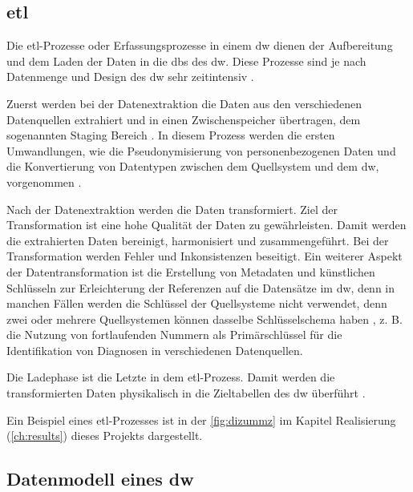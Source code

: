 
\subsection{\acs{etl}} \label{subsec:etl} 

Die \acf{etl}-Prozesse oder Erfassungsprozesse in einem \ac{dw} dienen der Aufbereitung und dem Laden der Daten in die \acp{db} des \ac{dw}. Diese Prozesse sind je nach Datenmenge und Design des \ac{dw} sehr zeitintensiv \cite{dwbauer, dwtool}.

Zuerst werden bei der Datenextraktion die Daten aus den verschiedenen Datenquellen extrahiert und in einen Zwischenspeicher übertragen, dem sogenannten Staging Bereich \cite{dwtool}. In diesem Prozess werden die ersten Umwandlungen, wie die Pseudonymisierung von personenbezogenen Daten und die Konvertierung von Datentypen zwischen dem Quellsystem und dem \ac{dw}, vorgenommen \cite{dwbauer}.

Nach der Datenextraktion werden die Daten transformiert. Ziel der Transformation ist eine hohe Qualität der Daten zu gewährleisten. Damit werden die extrahierten Daten bereinigt, harmonisiert und zusammengeführt. Bei der Transformation werden Fehler und Inkonsistenzen beseitigt. Ein weiterer Aspekt der Datentransformation ist die Erstellung von Metadaten und künstlichen Schlüsseln zur Erleichterung der Referenzen auf die Datensätze im \ac{dw}, denn in manchen Fällen werden die Schlüssel der Quellsysteme nicht verwendet, denn zwei oder mehrere Quellsystemen können dasselbe Schlüsselschema haben \cite{dwbauer, dwtool}, z. B. die Nutzung von fortlaufenden Nummern als Primärschlüssel für die Identifikation von Diagnosen in verschiedenen Datenquellen.

Die Ladephase ist die Letzte in dem \ac{etl}-Prozess. Damit werden die transformierten Daten physikalisch in die Zieltabellen des \ac{dw} überführt \cite{dwgoeken, dwtool}.

Ein Beispiel eines \ac{etl}-Prozesses ist in der \ref{fig:dizummz} im Kapitel \glqq Realisierung\grqq{} (\ref{ch:results}) dieses Projekts dargestellt.

\subsection{Datenmodell eines \acs{dw}} \label{subsec:datamodel}

